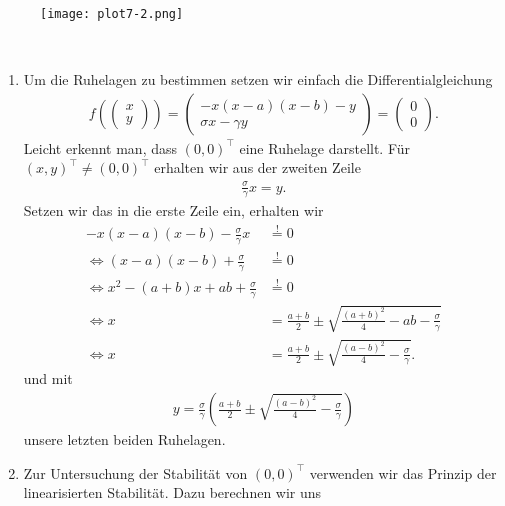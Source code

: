 \begin{solution}
  \FloatBarrier
  \begin{figure}
      \centering
      \texttt{[image: plot7-2.png]}
  \end{figure}
  \FloatBarrier
\leavevmode \\
\begin{enumerate}[label = \textbf{\alph*)}]
\item Um die Ruhelagen zu bestimmen setzen wir einfach die Differentialgleichung
\begin{align*}
  f\left(\begin{pmatrix}
    x \\ y
  \end{pmatrix}\right) =
  \begin{pmatrix}
    -x(x - a)(x - b) - y \\
    \sigma x - \gamma y
  \end{pmatrix}
  = \begin{pmatrix}
    0 \\ 0
  \end{pmatrix}.
\end{align*}
Leicht erkennt man, dass $(0,0)^{\top}$ eine Ruhelage darstellt.
Für $(x,y)^{\top} \neq (0,0)^{\top}$ erhalten wir aus der zweiten Zeile
\begin{align*}
   \frac{\sigma}{\gamma}x =  y.
\end{align*}
Setzen wir das in die erste Zeile ein, erhalten wir
\begin{align*}
  -x(x - a)(x - b) - \frac{\sigma}{\gamma}x &\stackrel{!}{=} 0 \\
  \iff (x - a)(x - b) + \frac{\sigma}{\gamma} &\stackrel{!}{=} 0 \\
  \iff x^2 -(a+b)x + ab + \frac{\sigma}{\gamma} &\stackrel{!}{=} 0 \\
  \iff x &= \frac{a+b}{2} \pm \sqrt{\frac{(a+b)^2}{4} - ab - \frac{\sigma}{\gamma}} \\
  \iff x &= \frac{a+b}{2} \pm \sqrt{\frac{(a-b)^2}{4}  - \frac{\sigma}{\gamma}}.
\end{align*}
und mit
\begin{align*}
  y = \frac{\sigma}{\gamma}\left(\frac{a+b}{2} \pm \sqrt{\frac{(a-b)^2}{4} - \frac{\sigma}{\gamma}}\right)
\end{align*}
unsere letzten beiden Ruhelagen.
\item Zur Untersuchung der Stabilität von $(0,0)^{\top}$ verwenden wir das Prinzip
der linearisierten Stabilität. Dazu berechnen wir uns
\begin{align*}

\end{align*}
\end{enumerate}
\end{solution}
